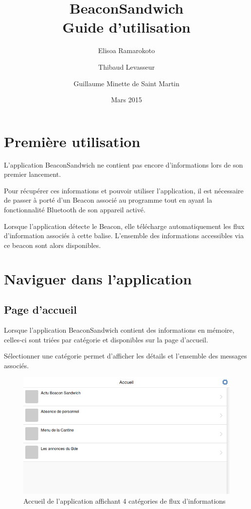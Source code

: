 \documentclass{report}
\title{\textbf{BeaconSandwich} \\ Guide d'utilisation}
\author{Elisoa Ramarokoto \and Thibaud Levasseur \and Guillaume Minette de Saint Martin }
\date{Mars 2015}
\begin{document}
\maketitle
\tableofcontents

\chapter{Première utilisation}

L'application BeaconSandwich ne contient pas encore d'informations lors de son premier lancement.

Pour récupérer ces informations et pouvoir utiliser l'application, il est nécessaire de passer à porté d'un Beacon associé au programme tout en ayant la fonctionnalité Bluetooth de son appareil activé. 

Lorsque l'application détecte le Beacon, elle télécharge automatiquement les flux d'information associés à cette balise. L'ensemble des informations accessibles via ce beacon sont alors disponibles.

\chapter{Naviguer dans l'application}

\section{Page d'accueil}

Lorsque l'application BeaconSandwich contient des informations en mémoire, celles-ci sont triées par catégorie et disponibles sur la page d'accueil.

Sélectionner une catégorie permet d'afficher les détails et l'ensemble des messages associés.

\begin{figure}[h]
	\centering
	\includegraphics[scale=0.28]{menu.png}
	\caption{Accueil de l'application affichant 4 catégories de flux d'informations}
\end{figure}
\end{document}
